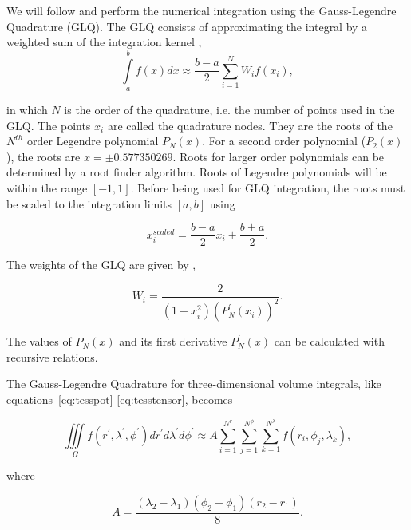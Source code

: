 \documentclass[paper,twocolumn]{geophysics}
\begin{document}
We will follow \citet{Asgharzadeh2007} and perform the numerical integration
using the Gauss-Legendre Quadrature (GLQ).
The GLQ consists of approximating the integral by a weighted sum of the
integration kernel \citep{Hildebrand1987},
\begin{equation}
    \int\limits_a^b f(x) dx \approx
    \frac{b-a}{2}\sum\limits_{i=1}^N W_i f(x_i),
    \label{eq:glq1d}
\end{equation}

\noindent
in which $N$ is the order of the quadrature,
i.e. the number of points used in the GLQ.
The points $x_i$ are called the quadrature nodes.
They are the roots of the $N^{th}$ order Legendre polynomial $P_N(x)$.
For a second order polynomial ($P_2(x)$),
the roots are $x = \pm 0.577350269$.
Roots for larger order polynomials
can be determined by a root finder algorithm.
Roots of Legendre polynomials
will be within the range $[-1, 1]$.
Before being used for GLQ integration,
the roots must be scaled to the integration limits $[a, b]$ using

\begin{equation}
    x^{scaled}_i = \frac{b - a}{2} x_i + \frac{b + a}{2}.
    \label{eq:glq_scaling}
\end{equation}

The weights of the GLQ are given by \citep{Hildebrand1987},

\begin{equation}
    W_i = \frac{2}{(1 - x_i^2)(P^\prime_N(x_i))^2}.
    \label{eq:glq_weights}
\end{equation}

\noindent
The values of $P_N(x)$ and its first derivative $P^\prime_N(x)$
can be calculated with recursive relations.

The Gauss-Legendre Quadrature for three-dimensional volume integrals,
like equations~\ref{eq:tesspot}-\ref{eq:tesstensor},
becomes \citep{Asgharzadeh2007}

\begin{equation}
    \iiint\limits_{\Omega}
    f(r^\prime, \lambda^\prime, \phi^\prime)
    dr^\prime d\lambda^\prime d\phi^\prime
    \approx
    A
    \sum\limits_{i=1}^{N^r}
    \sum\limits_{j=1}^{N^\phi}
    \sum\limits_{k=1}^{N^\lambda}
    f(r_i, \phi_j, \lambda_k),
    \label{eq:glq3d}
\end{equation}

\noindent
where

\begin{equation}
    A = \frac{(\lambda_2 - \lambda_1)(\phi_2 - \phi_1)(r_2 - r_1)}{8}.
\end{equation}
\end{document}
